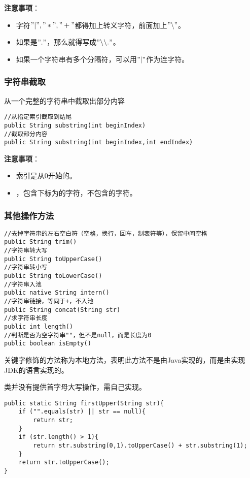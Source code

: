 \documentclass[a4paper]{report}
\begin{document}
\textbf{注意事项}：
\begin{itemize}
\itemsep=0pt \parskip =0pt
  \item 字符$"|","*","+"$都得加上转义字符，前面加上$"\backslash"$。
  \item 如果是$"."$，那么就得写成$"\backslash\backslash ."$。
  \item 如果一个字符串有多个分隔符，可以用$"|"$作为连字符。
\end{itemize}

\subsubsection{字符串截取}
从一个完整的字符串中截取出部分内容
\begin{lstlisting}
//从指定索引截取到结尾
public String substring(int beginIndex)
//截取部分内容
public String substring(int beginIndex,int endIndex)
\end{lstlisting}
\textbf{注意事项}：
\begin{itemize}
\itemsep=0pt \parskip =0pt
  \item 索引是从0开始的。
  \item {}，包含下标为的字符，不包含的字符。
\end{itemize}
\subsubsection{其他操作方法}
\begin{lstlisting}
//去掉字符串的左右空白符（空格，换行，回车，制表符等），保留中间空格
public String trim()
//字符串转大写
public String toUpperCase()
//字符串转小写
public String toLowerCase()
//字符串入池
public native String intern()
//字符串链接，等同于+，不入池
public String concat(String str)
//求字符串长度
public int length()
//判断是否为空字符串""，但不是null，而是长度为0
public boolean isEmpty()
\end{lstlisting}
关键字修饰的方法称为本地方法，表明此方法不是由Java实现的，而是由实现JDK的语言实现的。

类并没有提供首字母大写操作，需自己实现。

\begin{Verbatim}[frame=single,numbersep=5pt,xleftmargin=1.5em,xrightmargin=1.5em]
public static String firstUpper(String str){
    if ("".equals(str) || str == null){
        return str;
    }
    if (str.length() > 1){
        return str.substring(0,1).toUpperCase() + str.substring(1);
    }
    return str.toUpperCase();
}
\end{Verbatim}
\end{document}
